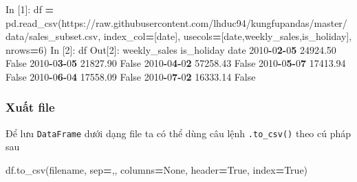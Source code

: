 \documentclass[
]{book}
\newenvironment{Shaded}{\begin{snugshade}}{\end{snugshade}}
\newcommand{\DecValTok}[1]{\textcolor[rgb]{0.00,0.00,0.81}{#1}}
\newcommand{\ErrorTok}[1]{\textcolor[rgb]{0.64,0.00,0.00}{\textbf{#1}}}
\newcommand{\FloatTok}[1]{\textcolor[rgb]{0.00,0.00,0.81}{#1}}
\newcommand{\NormalTok}[1]{#1}
\newcommand{\OperatorTok}[1]{\textcolor[rgb]{0.81,0.36,0.00}{\textbf{#1}}}
\newcommand{\StringTok}[1]{\textcolor[rgb]{0.31,0.60,0.02}{#1}}
\newcommand{\VariableTok}[1]{\textcolor[rgb]{0.00,0.00,0.00}{#1}}
\begin{document}
\begin{Shaded}
\begin{Highlighting}[]
\NormalTok{In [}\DecValTok{1}\NormalTok{]: df }\OperatorTok{=}\NormalTok{ pd.read\_csv(}\StringTok{\textquotesingle{}https://raw.githubusercontent.com/lhduc94/kungfupandas/master/data/sales\_subset.csv\textquotesingle{}}\NormalTok{, index\_col}\OperatorTok{=}\NormalTok{[}\StringTok{\textquotesingle{}date\textquotesingle{}}\NormalTok{], usecols}\OperatorTok{=}\NormalTok{[}\StringTok{\textquotesingle{}date\textquotesingle{}}\NormalTok{,}\StringTok{\textquotesingle{}weekly\_sales\textquotesingle{}}\NormalTok{,}\StringTok{\textquotesingle{}is\_holiday\textquotesingle{}}\NormalTok{], nrows}\OperatorTok{=}\DecValTok{6}\NormalTok{)}
\NormalTok{In [}\DecValTok{2}\NormalTok{]: df}
\NormalTok{Out[}\DecValTok{2}\NormalTok{]:}
\NormalTok{            weekly\_sales  is\_holiday}
\NormalTok{date                                }
\DecValTok{2010}\OperatorTok{{-}}\DecValTok{0}\ErrorTok{2}\OperatorTok{{-}}\DecValTok{0}\ErrorTok{5}      \FloatTok{24924.50}       \VariableTok{False}
\DecValTok{2010}\OperatorTok{{-}}\DecValTok{0}\ErrorTok{3}\OperatorTok{{-}}\DecValTok{0}\ErrorTok{5}      \FloatTok{21827.90}       \VariableTok{False}
\DecValTok{2010}\OperatorTok{{-}}\DecValTok{0}\ErrorTok{4}\OperatorTok{{-}}\DecValTok{0}\ErrorTok{2}      \FloatTok{57258.43}       \VariableTok{False}
\DecValTok{2010}\OperatorTok{{-}}\DecValTok{0}\ErrorTok{5}\OperatorTok{{-}}\DecValTok{0}\ErrorTok{7}      \FloatTok{17413.94}       \VariableTok{False}
\DecValTok{2010}\OperatorTok{{-}}\DecValTok{0}\ErrorTok{6}\OperatorTok{{-}}\DecValTok{0}\ErrorTok{4}      \FloatTok{17558.09}       \VariableTok{False}
\DecValTok{2010}\OperatorTok{{-}}\DecValTok{0}\ErrorTok{7}\OperatorTok{{-}}\DecValTok{0}\ErrorTok{2}      \FloatTok{16333.14}       \VariableTok{False}
\end{Highlighting}
\end{Shaded}

\subsubsection{Xuất file}\label{xuux1ea5t-file}

Để lưu \texttt{DataFrame} dưới dạng file ta có thể dùng câu lệnh \texttt{.to\_csv()} theo cú pháp sau

\begin{Shaded}
\begin{Highlighting}[]
\NormalTok{df.to\_csv(filename, sep}\OperatorTok{=}\StringTok{\textquotesingle{},\textquotesingle{}}\NormalTok{, columns}\OperatorTok{=}\VariableTok{None}\NormalTok{, header}\OperatorTok{=}\VariableTok{True}\NormalTok{, index}\OperatorTok{=}\VariableTok{True}\NormalTok{)}
\end{Highlighting}
\end{Shaded}
\end{document}
